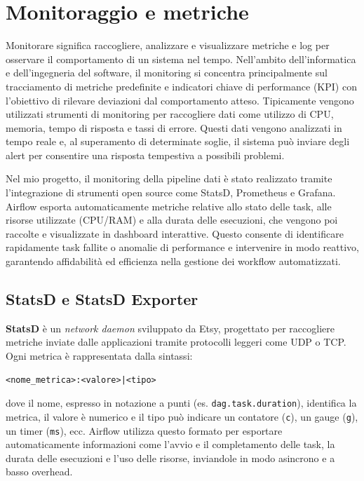 \section{Monitoraggio e metriche}
\label{sec:monitoraggioemetriche}

Monitorare significa raccogliere, analizzare e visualizzare metriche e log per osservare il comportamento di un sistema nel tempo. Nell’ambito dell’informatica e dell’ingegneria del software, il monitoring si concentra principalmente sul tracciamento di metriche predefinite e indicatori chiave di performance (KPI) con l’obiettivo di rilevare deviazioni dal comportamento atteso.
Tipicamente vengono utilizzati strumenti di monitoring per raccogliere dati come utilizzo di CPU, memoria, tempo di risposta e tassi di errore. Questi dati vengono analizzati in tempo reale e, al superamento di determinate soglie, il sistema può inviare degli alert per consentire una risposta tempestiva a possibili problemi.

Nel mio progetto, il monitoring della pipeline dati è stato realizzato tramite l’integrazione di strumenti open source come StatsD, Prometheus e Grafana. Airflow esporta automaticamente metriche relative allo stato delle task, alle risorse utilizzate (CPU/RAM) e alla durata delle esecuzioni, che vengono poi raccolte e visualizzate in dashboard interattive. Questo consente di identificare rapidamente task fallite o anomalie di performance e intervenire in modo reattivo, garantendo affidabilità ed efficienza nella gestione dei workflow automatizzati.

\subsection{StatsD e StatsD Exporter}
\label{sec:statsd}

\textbf{StatsD} è un \textit{network daemon} sviluppato da Etsy, progettato per raccogliere metriche inviate dalle applicazioni tramite protocolli leggeri come UDP o TCP. Ogni metrica è rappresentata dalla sintassi:

\begin{verbatim}
<nome_metrica>:<valore>|<tipo>
\end{verbatim}

dove il nome, espresso in notazione a punti (es. \texttt{dag.task.duration}), identifica la metrica, il valore è numerico e il tipo può indicare un contatore (\texttt{c}), un gauge (\texttt{g}), un timer (\texttt{ms}), ecc. Airflow utilizza questo formato per esportare automaticamente informazioni come l’avvio e il completamento delle task, la durata delle esecuzioni e l’uso delle risorse, inviandole in modo asincrono e a basso overhead.

